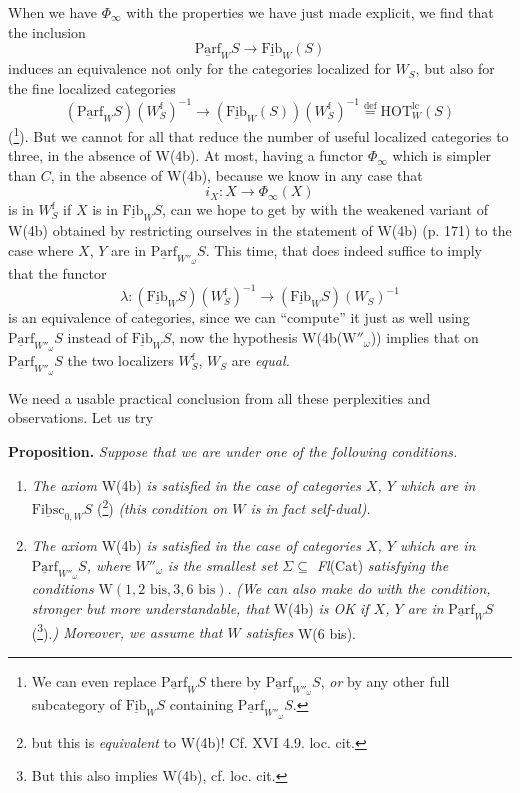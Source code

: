 \documentclass[11pt]{article}
\newcommand{\printedpage}[1]{\marginpar{\footnotesize p.~#1}}
\newcommand{\msp}[1]{\marginpar{\footnotesize [#1]}}
\newcommand{\und}[1]{\underline{\mathrm{#1}}}
\begin{document}
When we have $\Phi_\infty$ with the properties we have just made explicit, we find that the inclusion
\[
\und{Parf}_W S \longrightarrow \und{Fib}_W(S)
\]
induces an equivalence not only for the categories localized for $W_S$, but also for the fine localized categories
\[
(\und{Parf}_W S)(W_S^{\mathrm{f}})^{-1} \longrightarrow (\und{Fib}_W(S))(W_S^{\mathrm{f}})^{-1} \overset{\text{def}}{=} \mathrm{HOT}^{\mathrm{lc}}_W(S)
\]
(\footnote[94]{We can even replace $\und{Parf}_W S$ there by $\und{Parf}_{W''_\omega} S$, \textit{or} by any other full subcategory of $\und{Fib}_W S$ containing $\und{Parf}_{W''_\omega} S$.}). But we cannot for all that reduce the number of useful localized categories to three, in the absence of W(4b). At most, having a functor $\Phi_\infty$ which is simpler than $C$, in the absence of W(4b), because we know in any case that
\[
i_X : X \longrightarrow \Phi_\infty(X)
\]
is in $W_S^{\mathrm{f}}$ if $X$ is in $\und{Fib}_W S$, can we
\printedpage{121}
\msp{page 196}
hope to get by with the weakened variant of W(4b) obtained by restricting ourselves in the statement of W(4b) (p. 171) to the case where $X$, $Y$ are in $\und{Parf}_{W''_\omega} S$. This time, that does indeed suffice to imply that the functor
\[
\lambda : (\und{Fib}_W S)(W_S^{\mathrm{f}})^{-1} \longrightarrow (\und{Fib}_W S)(W_S)^{-1}
\]
is an equivalence of categories, since we can ``compute'' it just as well using $\und{Parf}_{W''_\omega} S$ instead of $\und{Fib}_W S$, now the hypothesis W(4b($\mathrm{W}''_\omega$)) implies that on $\und{Parf}_{W''_\omega} S$ the two localizers $W_S^{\mathrm{f}}$, $W_S$ are \textit{equal.}

We need a usable practical conclusion from all these perplexities and observations. Let us try

\textbf{Proposition.} \textit{Suppose that we are under one of the following conditions.}

\begin{enumerate}[label={}]
\item[$1^o$)] \textit{The axiom} W(4b) \textit{is satisfied in the case of categories $X$, $Y$ which are in} $\und{Fibsc}_{0,W} S$ (\footnote[95]{but this is \textit{equivalent} to W(4b)! Cf. XVI 4.9. loc. cit.}) \textit{(this condition on $W$ is in fact self-dual).}

\item[$2^o$)] \textit{The axiom} W(4b) \textit{is satisfied in the case of categories $X$, $Y$ which are in} $\und{Parf}_{W''_\omega} S$\textit{, where $W''_\omega$ is the smallest set $\Sigma \subseteq$ Fl}(Cat) \textit{satisfying the conditions} $\mathrm{W}(1, 2\text{ bis}, 3, 6\text{ bis})$. \textit{(We can also make do with the condition, stronger but more understandable, that} W(4b) \textit{is OK if $X$, $Y$ are in} $\und{Parf}_W S$ (\footnote[96]{But this also implies W(4b), cf. loc. cit.}).\textit{) Moreover, we assume that $W$ satisfies} W(6 bis).
\end{enumerate}
\end{document}
